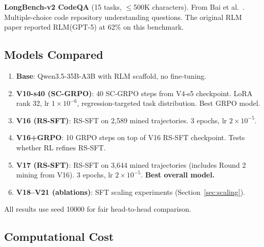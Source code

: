 \documentclass{article}
\begin{document}
\textbf{LongBench-v2 CodeQA} (15 tasks, $\leq$500K characters). From Bai et al.~\cite{longbenchv2}. Multiple-choice code repository understanding questions. The original RLM paper reported RLM(GPT-5) at 62\% on this benchmark.

\subsection{Models Compared}

\begin{enumerate}
    \item \textbf{Base}: Qwen3.5-35B-A3B with RLM scaffold, no fine-tuning.
    \item \textbf{V10-s40 (SC-GRPO)}: 40 SC-GRPO steps from V4-s5 checkpoint. LoRA rank 32, lr $1{\times}10^{-6}$, regression-targeted task distribution. Best GRPO model.
    \item \textbf{V16 (RS-SFT)}: RS-SFT on 2,589 mined trajectories. 3 epochs, lr $2{\times}10^{-5}$.
    \item \textbf{V16+GRPO}: 10 GRPO steps on top of V16 RS-SFT checkpoint. Tests whether RL refines RS-SFT.
    \item \textbf{V17 (RS-SFT)}: RS-SFT on 3,644 mined trajectories (includes Round 2 mining from V16). 3 epochs, lr $2{\times}10^{-5}$. \textbf{Best overall model.}
    \item \textbf{V18--V21 (ablations)}: SFT scaling experiments (Section~\ref{sec:scaling}).
\end{enumerate}

All results use seed 10000 for fair head-to-head comparison.

\subsection{Computational Cost}
\end{document}
